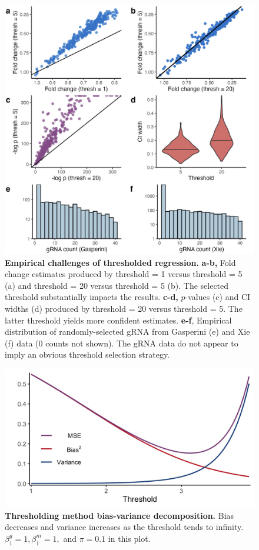 \documentclass[12pt]{article}
\begin{document}
\clearpage
\begin{figure}[h!]
	\centering
	\includegraphics[width=1\linewidth]{../../figures/thresholding_empirical/plot}
	\caption{\textbf{Empirical challenges of thresholded regression.} \textbf{a-b,} Fold change estimates produced by threshold = 1 versus threshold = 5 (a) and threshold = 20 versus threshold = 5 (b). The selected threshold substantially impacts the results. \textbf{c-d,} $p$-values (c) and CI widths (d) produced by threshold = 20 versus threshold = 5. The latter threshold yields more confident estimates. \textbf{e-f}, Empirical distribution of randomly-selected gRNA from Gasperini (e) and Xie (f) data (0 counts not shown). The gRNA data do not appear to imply an obvious threshold selection strategy.}
	\label{thresholding_empirical}
\end{figure}

\clearpage
\begin{figure}[h!]
	\centering
	\includegraphics[width=0.7\linewidth]{../../figures/thresholding_theoretical/plot}
	\caption{\textbf{Thresholding method bias-variance decomposition.} Bias decreases and variance increases as the threshold tends to infinity. $\beta^g_1 = 1, \beta^m_1 = 1,$ and $\pi = 0.1$ in this plot.}
	\label{thresholding_theoretical}
\end{figure}
\end{document}
